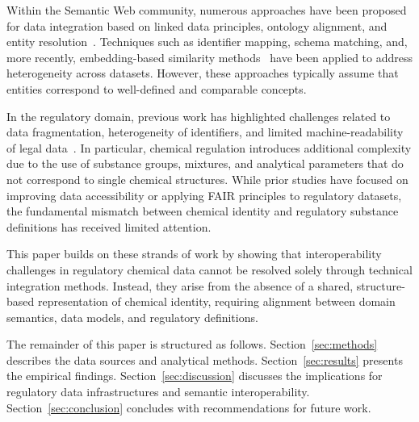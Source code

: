 Within the Semantic Web community, numerous approaches have been proposed for data integration based on linked data principles, ontology alignment, and entity resolution~\cite{DjoumbouFeunang2016}. Techniques such as identifier mapping, schema matching, and, more recently, embedding-based similarity methods~\cite{Reimers2019} have been applied to address heterogeneity across datasets. However, these approaches typically assume that entities correspond to well-defined and comparable concepts.

In the regulatory domain, previous work has highlighted challenges related to data fragmentation, heterogeneity of identifiers, and limited machine-readability of legal data~\cite{Filtz2021}. In particular, chemical regulation introduces additional complexity due to the use of substance groups, mixtures, and analytical parameters that do not correspond to single chemical structures. While prior studies have focused on improving data accessibility or applying FAIR principles to regulatory datasets, the fundamental mismatch between chemical identity and regulatory substance definitions has received limited attention.

This paper builds on these strands of work by showing that interoperability challenges in regulatory chemical data cannot be resolved solely through technical integration methods. Instead, they arise from the absence of a shared, structure-based representation of chemical identity, requiring alignment between domain semantics, data models, and regulatory definitions.

The remainder of this paper is structured as follows. Section~\ref{sec:methods} describes the data sources and analytical methods. Section~\ref{sec:results} presents the empirical findings. Section~\ref{sec:discussion} discusses the implications for regulatory data infrastructures and semantic interoperability. Section~\ref{sec:conclusion} concludes with recommendations for future work.



 